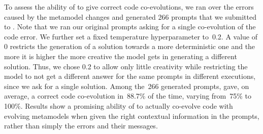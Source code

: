 To assess the ability of \LLM to give correct code co-evolutions, %
we ran over the errors caused by the metamodel changes and generated 266 prompts that we submitted to \LLM. 
Note that we ran our original prompts asking for a single co-evolution of the code error. We further set a fixed temperature hyperparameter to~0.2. A value of 0 restricts the generation of a solution towards a more deterministic one and the more it is higher the more creative the model gets in generating a different solution. Thus, we chose 0.2 to allow only little creativity while restricting the model to not get a different answer for the same prompts in different executions, since we ask for a single solution. 
%
Among the~266 generated prompts, \LLM gave, on average, a correct code co-evolution in~88.7\% of the time, varying from~75\% to 100\%. 
Results show a promising ability of \LLM to actually co-evolve code with evolving metamodels when given the right contextual information in the prompts, rather than simply the errors and their messages. 



